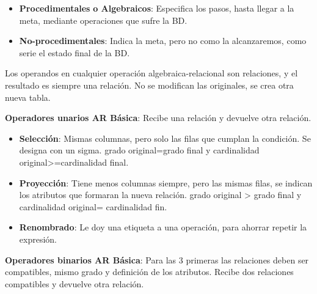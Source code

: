 \documentclass[12pt, twoside, openright]{report} %
\begin{document}
  \begin{itemize}
  \item \textbf{Procedimentales} \textbf{o Algebraicos}: Especifica los
    pasos, hasta llegar a la meta, mediante operaciones que sufre la BD.
    
  \item \textbf{No-procedimentales}: Indica la meta, pero no como la
    alcanzaremos, como serie el estado final de la BD.
    
  \end{itemize}

  
  Los operandos en cualquier operación algebraica-relacional son
  relaciones, y el resultado es siempre una relación. No se modifican
  las originales, se crea otra nueva tabla.
  

  
  \textbf{Operadores unarios AR Básica}: Recibe una relación y devuelve
  otra relación.
  

  \begin{itemize}
  \item \textbf{Selección}: Mismas columnas, pero solo las filas que cumplan
    la condición. Se designa con un sigma. grado original=grado final y
    cardinalidad original\textgreater=cardinalidad final.
    
  \item \textbf{Proyección}: Tiene menos columnas siempre, pero las mismas
    filas, se indican los atributos que formaran la nueva relación.
    grado original \textgreater{} grado final y cardinalidad original=
    cardinalidad fin.
    
  \item \textbf{Renombrado}: Le doy una etiqueta a una operación, para
    ahorrar repetir la expresión.
    
  \end{itemize}

  
  \textbf{Operadores binarios AR Básica}: Para las 3 primeras las
  relaciones deben ser compatibles, mismo grado y definición de los
  atributos. Recibe dos relaciones compatibles y devuelve otra relación.
  
\end{document}

